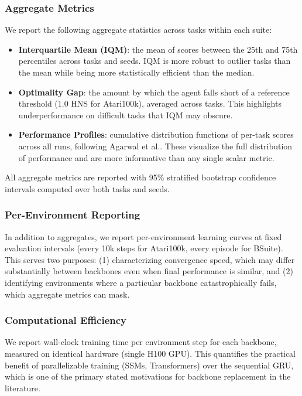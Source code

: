 \documentclass{article}
\begin{document}
\subsubsection{Aggregate Metrics}
We report the following aggregate statistics across tasks within each
suite:
\begin{itemize}
    \item \textbf{Interquartile Mean (IQM)}: the mean of scores
          between the 25th and 75th percentiles across tasks and
          seeds. IQM is more robust to outlier tasks than the mean
          while being more statistically efficient than the
          median\cite{rliable}.
    \item \textbf{Optimality Gap}: the amount by which the agent
          falls short of a reference threshold (1.0 HNS for
          Atari100k), averaged across tasks. This highlights
          underperformance on difficult tasks that IQM may obscure.
    \item \textbf{Performance Profiles}: cumulative distribution
          functions of per-task scores across all runs, following
          Agarwal et al.\cite{rliable}. These visualize the full
          distribution of performance and are more informative than
          any single scalar metric.
\end{itemize}
All aggregate metrics are reported with 95\% stratified bootstrap
confidence intervals computed over both tasks and seeds.

\subsubsection{Per-Environment Reporting}
In addition to aggregates, we report per-environment learning curves
at fixed evaluation intervals (every 10k steps for Atari100k, every
episode for BSuite). This serves two purposes: (1) characterizing
convergence speed, which may differ substantially between backbones
even when final performance is similar, and (2) identifying
environments where a particular backbone catastrophically fails,
which aggregate metrics can mask.

\subsubsection{Computational Efficiency}
We report wall-clock training time per environment step for each
backbone, measured on identical hardware (single H100 GPU). This
quantifies the practical benefit of parallelizable training
(SSMs, Transformers) over the sequential GRU, which is one of the
primary stated motivations for backbone replacement in the
literature\cite{memory,drama}.
\end{document}
